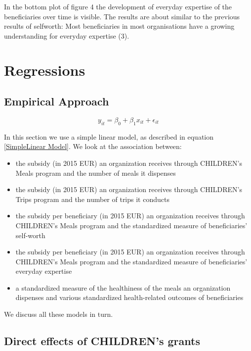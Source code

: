 \documentclass[12pt, a4paper, titlepage]{article}\usepackage[]{graphicx}\usepackage[]{color}
\begin{document}
In the bottom plot of figure 4 the development of everyday expertise of the beneficiaries over time is visible. The results are about similar to the previous results of selfworth: Most beneficiaries in most organisations have a growing understanding for everyday expertise (3). 

\section{Regressions}

\subsection{Empirical Approach} 

\begin{equation}
\label{SimpleLinearModel}
  y_{it} = \beta_0 + \beta_1 x_{it} + \epsilon_{it}
\end{equation}


In this section we use a simple linear model, as described in equation \ref{SimpleLinear Model}. We look at the association between: 

\begin{itemize}
  \item{the subsidy (in 2015 EUR) an organization receives through CHILDREN's Meals program and the number of meals it dispenses}
  \item{the subsidy (in 2015 EUR) an organization receives through CHILDREN's Trips program and the number of trips it conducts}
  \item{the subsidy per beneficiary (in 2015 EUR) an organization receives through CHILDREN's Meals program and the standardized measure of beneficiaries' self-worth}
  \item{the subsidy per beneficiary (in 2015 EUR) an organization receives through CHILDREN's Meals program and the standardized measure of beneficiaries' everyday expertise}
   \item{a standardized measure of the healthiness of the meals an organization dispenses and various standardized health-related outcomes of beneficiaries} 
\end{itemize}

We discuss all these models in turn.

\subsection{Direct effects of CHILDREN's grants} 
\end{document}

